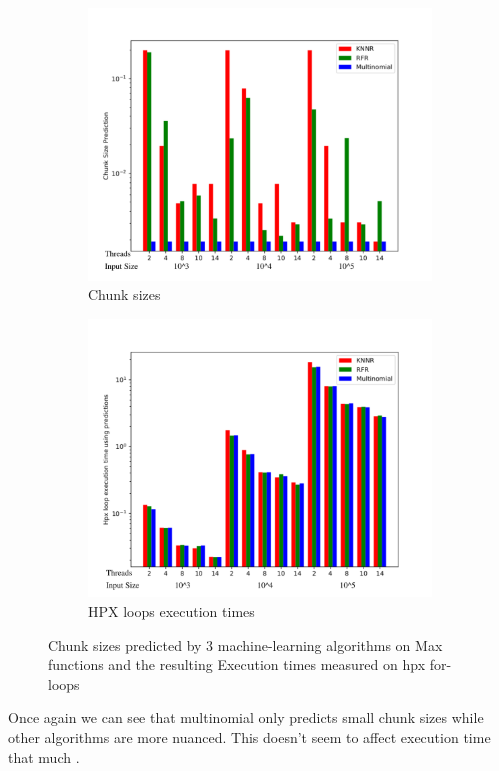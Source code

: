 \begin{figure}[h]
	\centering
	\begin{subfigure}[b]{0.5\textwidth}
		\centering
		\includegraphics[width=\textwidth]{images/bars_max_cs.pdf}
		\caption[Network2]%
		{{Chunk sizes}}    
	\end{subfigure}
	\hfill
	\begin{subfigure}[b]{0.49\textwidth}  
		\centering 
		\includegraphics[width=\textwidth]{images/bars_max_times.pdf}
		\caption[]%
		{{HPX loops execution times}}    
	\end{subfigure}
	\caption{Chunk sizes predicted by 3 machine-learning algorithms on Max functions and the resulting Execution times measured on hpx for-loops} 
\end{figure}
Once again we can see that multinomial only predicts small chunk sizes while other algorithms are more nuanced. This doesn't seem to affect execution time that much .
\newpage
